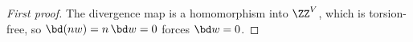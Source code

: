 \begin{proof}[First proof]
The divergence map is a homomorphism into $\ZZ^{V}$, which is torsion-free, so $\bd(n w) = n \, \bd w = 0$ forces $\bd w = 0$.
\end{proof}